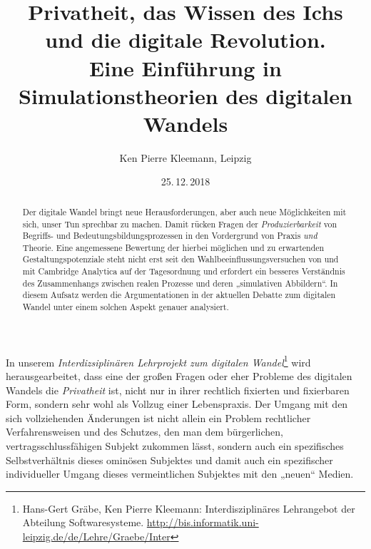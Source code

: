 \documentclass[a4paper,11pt]{article}
\title{Privatheit, das Wissen des Ichs\\ und die digitale Revolution.\\[12pt]
  \large Eine Einführung in Simulationstheorien des digitalen Wandels}
\author{Ken Pierre Kleemann, Leipzig}
\date{25.\,12.\,2018}
\begin{document}
\maketitle 

\begin{abstract}
  Der digitale Wandel bringt neue Herausforderungen, aber auch neue
  Möglichkeiten mit sich, unser Tun sprechbar zu machen.  Damit rücken Fragen
  der \emph{Produzierbarkeit} von Begriffs- und Bedeutungsbildungsprozessen in
  den Vordergrund von Praxis \emph{und} Theorie. Eine angemessene Bewertung
  der hierbei möglichen und zu erwartenden Gestaltungspotenziale steht nicht
  erst seit den Wahlbeeinflussungsversuchen von und mit Cambridge Analytica
  auf der Tagesordnung und erfordert ein besseres Verständnis des
  Zusammenhangs zwischen realen Prozesse und deren „simulativen Abbildern“.
  In diesem Aufsatz werden die Argumentationen in der aktuellen Debatte zum
  digitalen Wandel unter einem solchen Aspekt genauer analysiert.
\end{abstract}

In unserem \emph{Interdizsiplinären Lehrprojekt zum digitalen
  Wandel}\footnote{Hans-Gert Gräbe, Ken Pierre Kleemann: Interdisziplinäres
  Lehrangebot der Abteilung Softwaresysteme.
  \url{http://bis.informatik.uni-leipzig.de/de/Lehre/Graebe/Inter}} wird
herausgearbeitet, dass eine der großen Fragen oder eher Probleme des digitalen
Wandels die \emph{Privatheit} ist, nicht nur in ihrer rechtlich fixierten und
fixierbaren Form, sondern sehr wohl als Vollzug einer Lebenspraxis. Der Umgang
mit den sich vollziehenden Änderungen ist nicht allein ein Problem rechtlicher
Verfahrensweisen und des Schutzes, den man dem bürgerlichen,
vertragsschlussfähigen Subjekt zukommen lässt, sondern auch ein spezifisches
Selbstverhältnis dieses ominösen Subjektes und damit auch ein spezifischer
individueller Umgang dieses vermeintlichen Subjektes mit den „neuen“ Medien.
\end{document}
